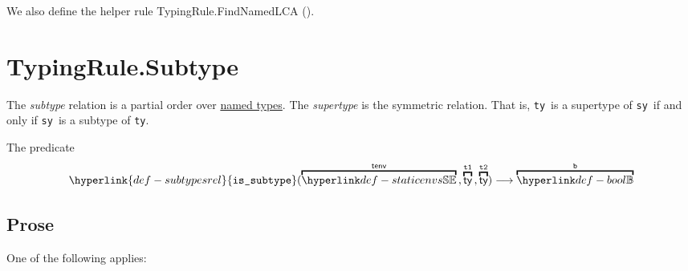 \documentclass{book}
\newcommand\subtypesrel[0]{\hyperlink{def-subtypesrel}{\texttt{is\_subtype}}}
\newcommand\tty[0]{\texttt{ty}}
\newcommand\tsy[0]{\texttt{sy}}
\begin{document}
We also define the helper rule TypingRule.FindNamedLCA ().

\section{TypingRule.Subtype\label{sec:TypingRule.Subtype}}
The \emph{subtype} relation is a partial order over \underline{named types}.
The \emph{supertype} is the symmetric relation. That is, \tty\ is a supertype of \tsy\ if and only if \tsy\ is a subtype of \tty.

\hypertarget{def-subtypesrel}{}
The predicate
\[
  \subtypesrel(\overname{\staticenvs}{\tenv} \aslsep \overname{\ty}{\vtone} \aslsep \overname{\ty}{\vttwo})
  \aslto \overname{\Bool}{\vb}
\]

\subsection{Prose}
One of the following applies:
\end{document}
